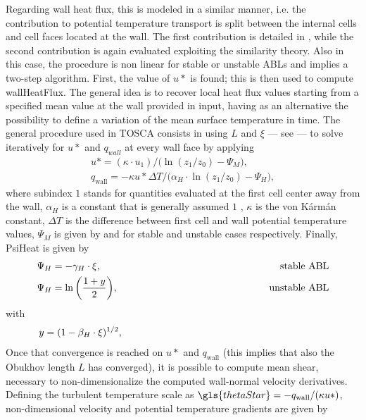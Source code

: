 Regarding wall heat flux, this is modeled in a similar manner, i.e. the contribution to potential temperature transport is split between the internal cells and cell faces located at the wall. The first contribution is detailed in , while the second contribution is again evaluated exploiting the \cite{MoninObukhov1954} similarity theory. Also in this case, the procedure is non linear for stable or unstable ABLs and implies a two-step algorithm. First, the value of $u*$ is found; this is then used to compute \gls{wallHeatFlux}. The general idea is to recover local heat flux values starting from a specified mean value at the wall provided in input, having as an alternative the possibility to define a variation of the mean surface temperature in time. The general procedure used in TOSCA consists in using $L$ and $\xi$ --- see  --- to solve iteratively for $u*$ and $q_{wall}$ at every wall face by applying 
\begin{align}
	& u* = (\kappa \cdot u_1) \big/ \big(\ln(z_1/z_0) - \Psi_M\big), & \mbox{} \\
	& q_\text{wall} = -\kappa u* \Delta T \big/ \big(\alpha_H \cdot \ln(z_1/z_0) - \Psi_H\big), & \mbox{}
\end{align}
where subindex $1$ stands for quantities evaluated at the first cell center away from the wall, $\alpha_H$ is a constant that is generally assumed $1$ \citep{Paulson1970}, $\kappa$ is the von K\'arm\'an constant, $\Delta T$ is the difference between first cell and wall potential temperature values, $\Psi_M$ is given by  and  for stable and unstable cases respectively. Finally, \gls{PsiHeat} is given by
\begin{align}
	& \Psi_H = -\gamma_H \cdot \xi, & \mbox{\hspace{5cm} stable ABL} \label{eq:stablePhiH}\\
	& \Psi_H = \ln\bigg(\frac{1+y}{2}\bigg), & \mbox{\hspace{5cm} unstable ABL} \label{eq:unstablePhiH} 
\end{align}
with 
\begin{align}
	& y = (1-\beta_H \cdot \xi)^{1/2}, & \mbox{\hspace{7cm}}
\end{align} 
Once that convergence is reached on $u*$ and $q_\text{wall}$ (this implies that also the Obukhov length $L$ has converged), it is possible to compute mean shear, necessary to non-dimensionalize the computed wall-normal velocity derivatives. Defining the turbulent temperature scale as $\gls{thetaStar} = - q_\text{wall} / (\kappa u*)$, non-dimensional velocity and potential temperature gradients are given by
